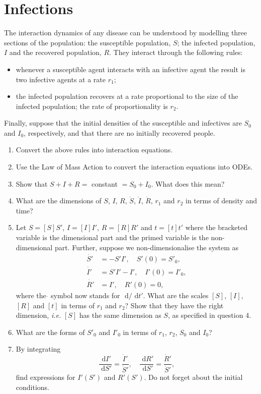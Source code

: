 \documentclass[]{article}
\newcommand{\bb}{\begin{equation}}
\newcommand{\ee}{\end{equation}}
\newcommand{\rd}{\text{ d}}
\newcommand{\ie}{\emph{i.e.} }
\begin{document}
\section{Infections}\label{Infections}
The interaction dynamics of any disease can be understood by modelling three sections of the population: the susceptible population, $S$; the infected population, $I$ and the recovered population, $R$. They interact through the following rules:
\begin{itemize}
\item whenever a susceptible agent interacts with an infective agent the result is two infective agents at a rate $r_1$;
\item the infected population recovers at a rate proportional to the size of the infected population; the rate of proportionality is $r_2$.
\end{itemize}
Finally, suppose that the initial densities of the susceptible and infectives are $S_0$ and $I_0$, respectively, and that there are no initially recovered people.
\begin{enumerate}
\item Convert the above rules into interaction equations.
\item Use the Law of Mass Action to convert the interaction equations into ODEs.
\item Show that $S+I+R=$ constant $=S_0+I_0$. What does this mean?
\item What are the dimensions of $S$, $I$, $R$, $\dot{S}$, $\dot{I}$, $\dot{R}$, $r_1$ and $r_2$ in terms of density and time?
\item Let $S=[S]S'$, $I=[I]I'$, $R=[R]R'$ and $t=[t]t'$ where the bracketed variable is the dimensional part and the primed variable is the non-dimensional part. Further, suppose  we non-dimensionalise the system as
\begin{align}
\dot{S'}&=-S'I',\quad S'(0)=S'_0,\nonumber\\
\dot{I'}&=S'I'-I',\quad I'(0)=I'_0,\nonumber\\
\dot{R'}&=I',\quad R'(0)=0,\nonumber
\end{align}
where the $\dot{}$ symbol now stands for $\rd/\rd t'$. What are the scales $[S]$, $[I]$, $[R]$ and $[t]$ in terms of $r_1$ and $r_2$? Show that they have the right dimension, \ie $[S]$ has the same dimension as $S$, as specified in question 4.
\item What are the forms of $S'_0$ and $I'_0$ in terms of $r_1$, $r_2$, $S_0$ and $I_0$?
\item By integrating
\bb
\frac{\rd I'}{\rd S'}=\frac{\dot{I}'}{\dot{S}'},\quad \frac{\rd R'}{\rd S'}=\frac{\dot{R}'}{\dot{S}'},
\ee
find expressions for $I'(S')$ and $R'(S')$. Do not forget about the initial conditions.
\end{enumerate}
\end{document}
